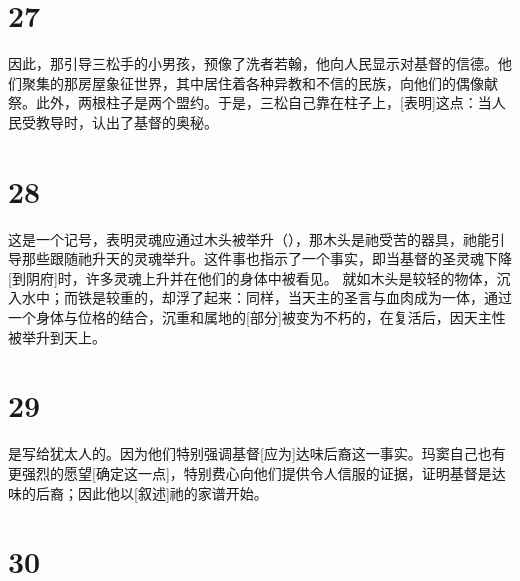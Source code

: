
\section{27}

因此，那引导三松手的小男孩，预像了洗者若翰，他向人民显示对基督的信德。他们聚集的那房屋象征世界，其中居住着各种异教和不信的民族，向他们的偶像献祭。此外，两根柱子是两个盟约。于是，三松自己靠在柱子上，[表明]这点：当人民受教导时，认出了基督的奥秘。\par


\section{28}

 这是一个记号，表明灵魂应通过木头被举升（），那木头是祂受苦的器具，祂能引导那些跟随祂升天的灵魂举升。这件事也指示了一个事实，即当基督的圣灵魂下降[到阴府]时，许多灵魂上升并在他们的身体中被看见。 就如木头是较轻的物体，沉入水中；而铁是较重的，却浮了起来：同样，当天主的圣言与血肉成为一体，通过一个身体与位格的结合，沉重和属地的[部分]被变为不朽的，在复活后，因天主性被举升到天上。\par


\section{29}

是写给犹太人的。因为他们特别强调基督[应为]达味后裔这一事实。玛窦自己也有更强烈的愿望[确定这一点]，特别费心向他们提供令人信服的证据，证明基督是达味的后裔；因此他以[叙述]祂的家谱开始。\par


\section{30}

